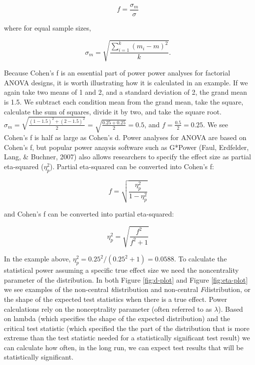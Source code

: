 \documentclass[,man,floatsintext]{apa6}
\begin{document}
\begin{equation}
f = \frac{\sigma _{ m }}{\sigma}
\end{equation}

where for equal sample sizes,

\begin{equation}
\sigma _{ m } = \sqrt { \frac { \sum_ { i = 1 } ^ { k } ( m _ { i } - m ) ^ { 2 } } { k } }.
\end{equation}

Because Cohen's f is an essential part of power power analyses for
factorial ANOVA designs, it is worth illustrating how it is calculated
in an example. If we again take two means of 1 and 2, and a standard
deviation of 2, the grand mean is 1.5. We subtract each condition mean
from the grand mean, take the square, calculate the sum of squares,
divide it by two, and take the square root.
\(\sigma_m = \sqrt{\frac{(1-1.5)^2+(2-1.5)^2}{2}} = \sqrt{\frac{0.25+0.25}{2}} = 0.5\),
and \(f = \frac{0.5}{2} = 0.25.\) We see Cohen's f is half as large as
Cohen's d. Power analyses for ANOVA are based on Cohen's f, but popular
power anaysis software such as G*Power (Faul, Erdfelder, Lang, \&
Buchner, 2007) also allows researchers to specify the effect size as
partial eta-squared (\(\eta_p^2\)). Partial eta-squared can be converted
into Cohen's f:

\begin{equation}
f = \sqrt{\frac{\eta_p^2}{1-\eta_p^2}}
\end{equation}

and Cohen's f can be converted into partial eta-squared:

\begin{equation}
\eta_p^2 = \sqrt{\frac{f^2}{f^2+1}}
\end{equation}

In the example above, \(\eta_p^2 = 0.25^2/(0.25^2+1) = 0.0588\). To
calculate the statistical power assuming a specific true effect size we
need the noncentrality parameter of the distribution. In both Figure
\ref{fig:d-plot} and Figure \ref{fig:eta-plot} we see examples of the
non-central \emph{t}distribution and non-central \emph{F}distribution,
or the shape of the expected test statistics when there is a true
effect. Power calculations rely on the nonceptrality parameter (often
referred to as \(\lambda\)). Based on lambda (which specifies the shape
of the expected distribution) and the critical test statistic (which
specified the the part of the distribution that is more extreme than the
test statistic needed for a statistically significant test result) we
can calculate how often, in the long run, we can expect test results
that will be statistically significant.
\end{document}
